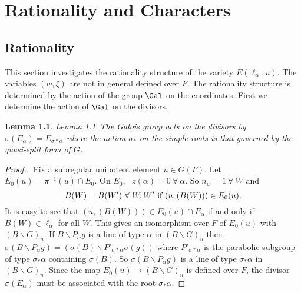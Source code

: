 \documentclass{memo-l}
\newtheorem{lemma}[theorem]{Lemma}
\theoremstyle{definition}
\theoremstyle{remark}
\numberwithin{section}{chapter}
\numberwithin{equation}{chapter}
\begin{document}


\chapter{Rationality and Characters}





\section{Rationality}

   This section investigates the rationality structure of the variety
$E({\ell}_{{\alpha}},u)$.  The variables $(w,{\xi})$ are not in general
defined over $F$.  The rationality structure is determined by the action of
the group $\Gal$ on the coordinates.  First we determine the
action of $\Gal$ on the divisors.



\begin{lemma}{Lemma 1.1}\ The Galois group acts on the divisors by
${\sigma}(E_{{\alpha}}) = E_{{\sigma}*{\alpha}}$ where the action
${\sigma}_{*}$ on the simple roots is that governed by the quasi-split form
of $G$.
\end{lemma}

\begin{proof} \  Fix a subregular unipotent element $u  \in  G(F)$.  Let $E_{0}(u)
 =  {\pi}^{-1}(u)  \cap  E_{0}$.  On $E_{0}$, \  $z({\alpha}) = 0 {\ \forall\  }
{\alpha}$.  So $n_{w} = 1 {\ \forall\ } W$ and $$B(W) = B(W') {\ \forall\ }
W,W'\ \hbox{if} \  (u,(B(W)))  \in  E_{0}(u).$$ It is easy to see that $(u,(B(W)))
 \in  E_{0}(u)  \cap  E_{{\alpha}}$ if and only if $B(W)  \in
{\ell}_{{\alpha}}$ for all $W$.  This gives an isomorphism over $F$ of
$E_{0}(u)$ with $(B\backslash G)_{u}$.  If $B\backslash P_{{\alpha}}g$ is a
line of type ${\alpha}$ in $(B\backslash G)_{u}$ then ${\sigma}(B\backslash
P_{{\alpha}}g)  =  ({\sigma}(B)\backslash P'_{{\sigma}*{\alpha}}{\sigma}(g))$
where $P'_{{\sigma}*{\alpha}}$ is the parabolic subgroup of type
${\sigma}_{*}{\alpha}$ containing ${\sigma}(B)$.  So ${\sigma}(B\backslash
P_{{\alpha}}g)$ is a line of type ${\sigma}_{*}{\alpha}$ in $(B\backslash
G)_{u}$.  Since the map $E_{0}(u) {\to} (B\backslash G)_{u}$ is defined
over $F$, the divisor ${\sigma}(E_{{\alpha}})$ must be associated with the
root ${\sigma}_{*}{\alpha}$.
\end{proof}
\end{document}
